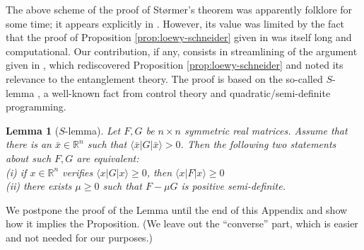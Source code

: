 \documentclass[10pt]{article}
\renewcommand{\geq}{\geqslant}
\def\tcr{\textcolor{red}}
\newcommand{\R}{\mathbb{R}}
\newcommand{\bra}[1]{\langle #1 |}
\newcommand{\ket}[1]{| #1 \rangle}
\theoremstyle{plain}
\newtheorem{lemma}[theorem]{Lemma}
\theoremstyle{definition}
\theoremstyle{remark}
\begin{document}
The above scheme of the proof of St{\o}rmer's theorem was apparently folklore for some time; 
it appears explicitly in \cite{MillerOlkiewicz15}. However, its value was limited by the fact that 
the proof  of Proposition \ref{prop:loewy-schneider} given in  \cite{LoewySchneider75} 
was itself long and computational. 
Our contribution, if any, consists in streamlining of the argument  given in \cite{Hildebrand05, Hildebrand07}, 
which rediscovered Proposition \ref{prop:loewy-schneider} and noted its relevance to 
the entanglement theory. 
The proof is based on the so-called $S$-lemma \cite{Yakubovich73}, 
 a well-known fact from control theory and quadratic/semi-definite programming.   

\begin{lemma} [$S$-lemma] \label{lemma:S-lemma-II}
Let $F, G$ be $n\times n$  symmetric real matrices. Assume that 
 there is an $\bar{x} \in \R^n$ such that $\bra{\bar{x}}G\ket{\bar{x}} > 0$.  
Then the following two statements about such $F, G$ are equivalent:\\
(i) if $x \in \R^n$ verifies $ \bra{x} G \ket{x}\geq 0$, then $ \bra{x} F \ket{x}\geq 0$\\ 
(ii) there exists  $\mu \geq 0$ such that $F - \mu G$ is positive semi-definite. 
\end{lemma}


We postpone the proof of the Lemma until the end of this Appendix and show how 
it implies the Proposition. (We leave out the ``converse'' part, which is easier 
and not needed for our purposes.)
\end{document}
